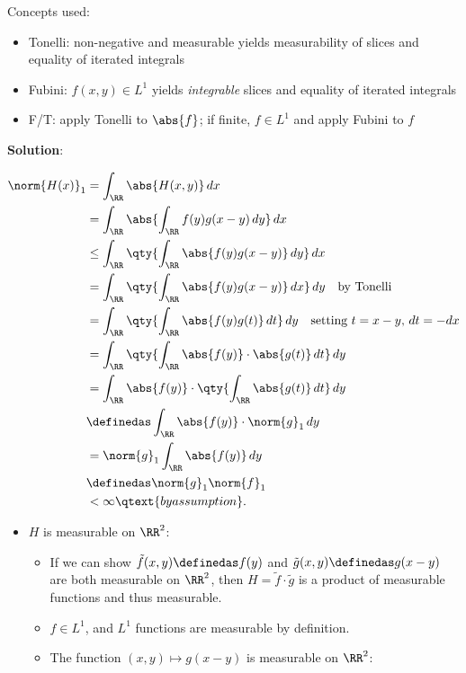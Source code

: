\begin{solution}

Concepts used:

\begin{itemize}
\tightlist
\item
  Tonelli: non-negative and measurable yields measurability of slices
  and equality of iterated integrals
\item
  Fubini: \(f(x, y) \in L^1\) yields \emph{integrable} slices and
  equality of iterated integrals
\item
  F/T: apply Tonelli to \(\abs{f}\); if finite, \(f\in L^1\) and apply
  Fubini to \(f\)
\end{itemize}

\textbf{Solution}:

\begin{align*}
\norm{H(x)}_1 
&= \int_\RR \abs{H(x, y)} \, dx \\
&= \int_\RR \abs{ \int_\RR f(y)g(x-y) \,dy } \, dx \\
&\leq \int_\RR \qty{ \int_\RR \abs{f(y)g(x-y)}  \, dy } \, dx \\
&= \int_\RR \qty{ \int_\RR \abs{f(y)g(x-y)}  \, dx} \, dy \quad\text{by Tonelli} \\
&= \int_\RR \qty{ \int_\RR \abs{f(y)g(t)}  \, dt} \, dy \quad\text{setting } t=x-y, \,dt = - dx \\
&= \int_\RR \qty{ \int_\RR \abs{f(y)}\cdot \abs{g(t)}  \, dt}\, dy \\
&= \int_\RR \abs{f(y)} \cdot \qty{ \int_\RR \abs{g(t)}  \, dt}\, dy \\
&\definedas \int_\RR \abs{f(y)} \cdot \norm{g}_1 \,dy \\
&= \norm{g}_1 \int_\RR \abs{f(y)} \,dy \\
&\definedas \norm{g}_1 \norm{f}_1  \\
&< \infty \qtext{by assumption}
.\end{align*}

\begin{itemize}
\tightlist
\item
  \(H\) is measurable on \(\RR^2\):

  \begin{itemize}
  \tightlist
  \item
    If we can show \(\tilde f(x, y) \definedas f(y)\) and
    \(\tilde g(x, y) \definedas g(x-y)\) are both measurable on
    \(\RR^2\), then \(H = \tilde f \cdot \tilde g\) is a product of
    measurable functions and thus measurable.
  \item
    \(f \in L^1\), and \(L^1\) functions are measurable by definition.
  \item
    The function \((x, y) \mapsto g(x-y)\) is measurable on \(\RR^2\):


\end{itemize}
\end{itemize}
\end{solution}
